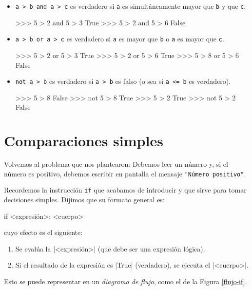 \begin{itemize}
\item \lstinline!a > b and a > c! es verdadero si \lstinline!a! es
simultáneamente mayor que \lstinline!b! y que \lstinline!c!.

\begin{codigo-python-sn}
>>> 5 > 2 and 5 > 3
True
>>> 5 > 2 and 5 > 6
False
\end{codigo-python-sn}

\item \lstinline!a > b or a > c! es verdadero si \lstinline!a! es mayor que
\lstinline!b! o \lstinline!a! es mayor que \lstinline!c!.

\begin{codigo-python-sn}
>>> 5 > 2 or 5 > 3
True
>>> 5 > 2 or 5 > 6
True
>>> 5 > 8 or 5 > 6
False
\end{codigo-python-sn}

\item \lstinline!not a > b! es verdadero si \lstinline!a > b! es falso (o
sea si \lstinline!a <= b! es verdadero).

\begin{codigo-python-sn}
>>> 5 > 8
False
>>> not 5 > 8
True
>>> 5 > 2
True
>>> not 5 > 2
False
\end{codigo-python-sn}

\end{itemize}

\section{Comparaciones simples}

Volvemos al problema que nos plantearon: Debemos leer un número y, si el
número es positivo, debemos escribir en pantalla el mensaje
 \lstinline!"Número positivo"!.

Recordemos la instrucción \lstinline!if! que acabamos de introducir y que sirve
para tomar decisiones simples. Dijimos que su formato general es:
\begin{codigo-python-sn}
if <expresión>:
    <cuerpo>
\end{codigo-python-sn}
cuyo efecto es el siguiente:
\begin{enumerate}
\item Se evalúa la |<expresión>| (que debe ser una expresión lógica).
\item Si el resultado de la expresión es |True| (verdadero), se ejecuta el |<cuerpo>|.
\end{enumerate}
Esto se puede representar en un \emph{diagrama de flujo}, como el de la Figura
\ref{flujo-if}.

